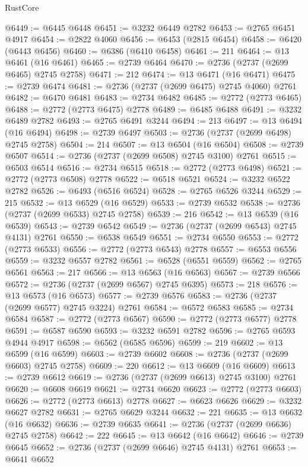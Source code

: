 \begin{lexlean}{RustCore}
\begin{coremodule}
@6449 := @6445 @6448
@6451 := @3232 @6449 @2782
@6453 := @2765 @6451 @4917
@6454 := @2822 @4060
@6456 := @6453 (@2815 @6454)
@6458 := @6420 (@6443 @6456)
@6460 := @6386 (@6410 @6458)
@6461 := 211
@6464 := @13 @6461 (@16 @6461)
@6465 := @2739 @6464
@6470 := @2736 (@2737 (@2699 @6465) @2745 @2758)
@6471 := 212
@6474 := @13 @6471 (@16 @6471)
@6475 := @2739 @6474
@6481 := @2736 (@2737 (@2699 @6475) @2745 @4060) @2761
@6482 := @6470 @6481
@6483 := @2734 @6482
@6485 := @2772 (@2773 @6465)
@6488 := @2772 (@2773 @6475) @2778
@6489 := @6485 @6488
@6491 := @3232 @6489 @2782
@6493 := @2765 @6491 @3244
@6494 := 213
@6497 := @13 @6494 (@16 @6494)
@6498 := @2739 @6497
@6503 := @2736 (@2737 (@2699 @6498) @2745 @2758)
@6504 := 214
@6507 := @13 @6504 (@16 @6504)
@6508 := @2739 @6507
@6514 := @2736 (@2737 (@2699 @6508) @2745 @3100) @2761
@6515 := @6503 @6514
@6516 := @2734 @6515
@6518 := @2772 (@2773 @6498)
@6521 := @2772 (@2773 @6508) @2778
@6522 := @6518 @6521
@6524 := @3232 @6522 @2782
@6526 := @6493 (@6516 @6524)
@6528 := @2765 @6526 @3244
@6529 := 215
@6532 := @13 @6529 (@16 @6529)
@6533 := @2739 @6532
@6538 := @2736 (@2737 (@2699 @6533) @2745 @2758)
@6539 := 216
@6542 := @13 @6539 (@16 @6539)
@6543 := @2739 @6542
@6549 := @2736 (@2737 (@2699 @6543) @2745 @4131) @2761
@6550 := @6538 @6549
@6551 := @2734 @6550
@6553 := @2772 (@2773 @6533)
@6556 := @2772 (@2773 @6543) @2778
@6557 := @6553 @6556
@6559 := @3232 @6557 @2782
@6561 := @6528 (@6551 @6559)
@6562 := @2765 @6561
@6563 := 217
@6566 := @13 @6563 (@16 @6563)
@6567 := @2739 @6566
@6572 := @2736 (@2737 (@2699 @6567) @2745 @6395)
@6573 := 218
@6576 := @13 @6573 (@16 @6573)
@6577 := @2739 @6576
@6583 := @2736 (@2737 (@2699 @6577) @2745 @3224) @2761
@6584 := @6572 @6583
@6585 := @2734 @6584
@6587 := @2772 (@2773 @6567)
@6590 := @2772 (@2773 @6577) @2778
@6591 := @6587 @6590
@6593 := @3232 @6591 @2782
@6596 := @2765 @6593 @4944 @4917
@6598 := @6562 (@6585 @6596)
@6599 := 219
@6602 := @13 @6599 (@16 @6599)
@6603 := @2739 @6602
@6608 := @2736 (@2737 (@2699 @6603) @2745 @2758)
@6609 := 220
@6612 := @13 @6609 (@16 @6609)
@6613 := @2739 @6612
@6619 := @2736 (@2737 (@2699 @6613) @2745 @3100) @2761
@6620 := @6608 @6619
@6621 := @2734 @6620
@6623 := @2772 (@2773 @6603)
@6626 := @2772 (@2773 @6613) @2778
@6627 := @6623 @6626
@6629 := @3232 @6627 @2782
@6631 := @2765 @6629 @3244
@6632 := 221
@6635 := @13 @6632 (@16 @6632)
@6636 := @2739 @6635
@6641 := @2736 (@2737 (@2699 @6636) @2745 @2758)
@6642 := 222
@6645 := @13 @6642 (@16 @6642)
@6646 := @2739 @6645
@6652 := @2736 (@2737 (@2699 @6646) @2745 @4131) @2761
@6653 := @6641 @6652

\end{coremodule}
\end{lexlean}
